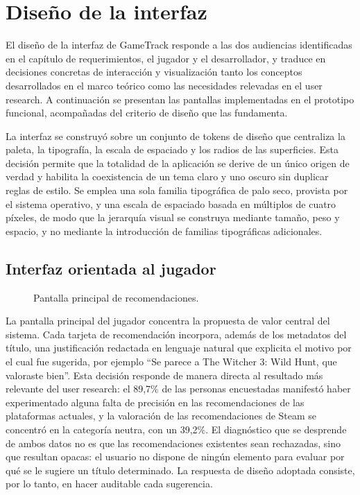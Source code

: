 \chapter{Diseño de la interfaz}\label{chapter:diseno_interfaz}

El diseño de la interfaz de GameTrack responde a las dos audiencias identificadas en el capítulo de requerimientos, el jugador y el desarrollador, y traduce en decisiones concretas de interacción y visualización tanto los conceptos desarrollados en el marco teórico como las necesidades relevadas en el user research. A continuación se presentan las pantallas implementadas en el prototipo funcional, acompañadas del criterio de diseño que las fundamenta.

La interfaz se construyó sobre un conjunto de tokens de diseño que centraliza la paleta, la tipografía, la escala de espaciado y los radios de las superficies. Esta decisión permite que la totalidad de la aplicación se derive de un único origen de verdad y habilita la coexistencia de un tema claro y uno oscuro sin duplicar reglas de estilo. Se emplea una sola familia tipográfica de palo seco, provista por el sistema operativo, y una escala de espaciado basada en múltiplos de cuatro píxeles, de modo que la jerarquía visual se construya mediante tamaño, peso y espacio, y no mediante la introducción de familias tipográficas adicionales.

\section*{Interfaz orientada al jugador}

\begin{figure}[ht]
	\centering
	\caption{Pantalla principal de recomendaciones.}
	\label{fig:ui-recomendaciones}
\end{figure}

La pantalla principal del jugador concentra la propuesta de valor central del sistema. Cada tarjeta de recomendación incorpora, además de los metadatos del título, una justificación redactada en lenguaje natural que explicita el motivo por el cual fue sugerida, por ejemplo \enquote{Se parece a The Witcher 3: Wild Hunt, que valoraste bien}. Esta decisión responde de manera directa al resultado más relevante del user research: el 89,7\% de las personas encuestadas manifestó haber experimentado alguna falta de precisión en las recomendaciones de las plataformas actuales, y la valoración de las recomendaciones de Steam se concentró en la categoría neutra, con un 39,2\%. El diagnóstico que se desprende de ambos datos no es que las recomendaciones existentes sean rechazadas, sino que resultan opacas: el usuario no dispone de ningún elemento para evaluar por qué se le sugiere un título determinado. La respuesta de diseño adoptada consiste, por lo tanto, en hacer auditable cada sugerencia.

